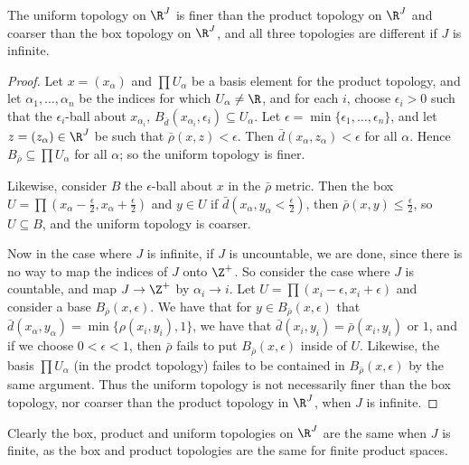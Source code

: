 \begin{theorem}\label{2.2.9}
    The uniform topology on $\R^J$ is finer than the product topology on  $\R^J$ and coarser than
    the box topology on  $\R^J$, and all three topologies are different if  $J$ is infinite.
\end{theorem}
\begin{proof}
    Let $x=(x_\alpha)$ and $\prod{U_{\alpha}}$ be a basis element for the product topology, and
    let $\alpha_1 ,\dots, \alpha_n$ be the indices for which $U_{\alpha} \neq \R$, and for each $i$,
    choose  $\epsilon_i>0$ such that the  $\epsilon_i$-ball about  $x_{\alpha_i}$,
    $B_{\bar{d}}(x_{\alpha_i},\epsilon_i) \subseteq U_{\alpha}$. Let $\epsilon=\min\{\epsilon_1,
    \dots, \epsilon_n\}$, and let $z=(z_{\alpha}) \in \R^J$ be such that $\bar{\rho}(x,z)<\epsilon$.
    Then $\bar{d}(x_{\alpha},z_{\alpha})<\epsilon$ for all $\alpha$. Hence  $B_{\bar{\rho}}
    \subseteq \prod{U_{\alpha}}$ for all $\alpha$; so the uniform topology is finer.

    Likewise, consider $B$ the $\epsilon$-ball about  $x$ in the  $\bar{\rho}$ metric. Then the box
    $U=\prod{(x_{\alpha}-\frac{\epsilon}{2},x_{\alpha}+\frac{\epsilon}{2})}$ and $y \in U$ if
    $\bar{d}(x_{\alpha},y_{\alpha}<\frac{\epsilon}{2})$, then $\bar {\rho}(x,y) \leq
    \frac{\epsilon}{2}$, so $U \subseteq B$, and the uniform topology is coarser.

    Now in the case where  $J$ is infinite, if  $J$ is uncountable, we are done, since there is no
    way to map the indices of  $J$ onto  $\Z^+$. So consider the case where  $J$ is countable, and
    map  $J \rightarrow \Z^+$ by  $\alpha_i \rightarrow i$. Let
    $U=\prod{(x_i-\epsilon,x_i+\epsilon)}$ and consider a base $B_{\bar{\rho}}(x,\epsilon)$. We have
    that for  $y \in B_{\bar{\rho}}(x,\epsilon)$ that
    $\bar{d}(x_{\alpha},y_{\alpha})=\min\{\rho(x_i,y_i),1\}$, we have that
    $\bar{d}(x_i,y_i)=\bar{\rho}(x_i,y_i)$ or $1$, and if we choose  $0<\epsilon<1$, then
    $\bar{\rho}$ fails to put $B_{\bar{\rho}}(x,\epsilon)$ inside of $U$. Likewise, the basis
    $\prod{U_{\alpha}}$ (in the prodct topology) failes to be contained in
    $B_{\bar{\rho}}(x,\epsilon)$ by the same argument. Thus the uniform topology is not necessarily finer than
    the box topology, nor coarser than the product topology in $\R^J$, when $J$ is infinite.
\end{proof}
\begin{remark}
    Clearly the box, product and uniform topologies on $\R^J$ are the same when  $J$ is finite, as
    the box and product topologies are the same for finite product spaces.
\end{remark}

